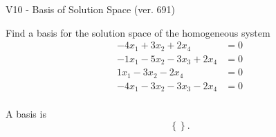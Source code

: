 \begin{exercise}
  \begin{exerciseTitle}V10 - Basis of Solution Space (ver. 691)\end{exerciseTitle}
  \begin{exerciseStatement}
    Find a basis for the solution space of the homogeneous system 
\begin{align*}
 -4 x_ 1 + 3 x_ 2 + 2 x_ 4 &= 0  \\ 
  -1 x_ 1 -5 x_ 2 -3 x_ 3 + 2 x_ 4 &= 0  \\ 
  1 x_ 1 -3 x_ 2 -2 x_ 4 &= 0  \\ 
  -4 x_ 1 -3 x_ 2 -3 x_ 3 -2 x_ 4 &= 0  \\ 
 \end{align*}


 
  \end{exerciseStatement}

  \begin{exerciseAnswer}
   A basis is   
\[\left\{\right\}.\]

  


  \end{exerciseAnswer}
\end{exercise}